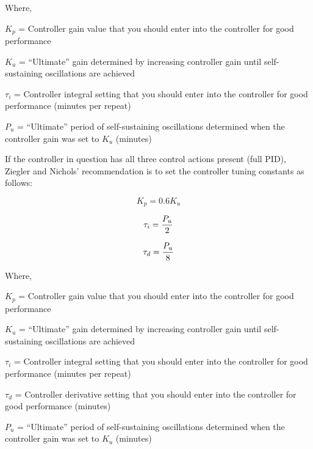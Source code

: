 \noindent
Where,

$K_p$ = Controller gain value that you should enter into the controller for good performance

$K_u$ = ``Ultimate'' gain determined by increasing controller gain until self-sustaining oscillations are achieved

$\tau_i$ = Controller integral setting that you should enter into the controller for good performance (minutes per repeat)

$P_u$ = ``Ultimate'' period of self-sustaining oscillations determined when the controller gain was set to $K_u$ (minutes)

\vskip 10pt


\filbreak

If the controller in question has all three control actions present (full PID), Ziegler and Nichols' recommendation is to set the controller tuning constants as follows:

$$K_p = 0.6 K_u$$

$$\tau_i = {P_u \over 2}$$

$$\tau_d = {P_u \over 8}$$

\noindent
Where,

$K_p$ = Controller gain value that you should enter into the controller for good performance

$K_u$ = ``Ultimate'' gain determined by increasing controller gain until self-sustaining oscillations are achieved

$\tau_i$ = Controller integral setting that you should enter into the controller for good performance (minutes per repeat)

$\tau_d$ = Controller derivative setting that you should enter into the controller for good performance (minutes)

$P_u$ = ``Ultimate'' period of self-sustaining oscillations determined when the controller gain was set to $K_u$ (minutes)

\vskip 10pt

